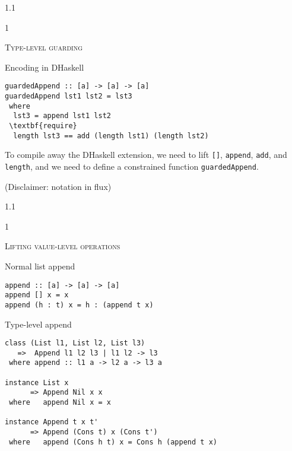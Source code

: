 \documentclass{slides}
\newcommand{\header}[1]{{\large\scshape \color{Red} #1} \medskip }
\newcommand{\blau}[1]{{\color{Blue} #1} \medskip }
\newenvironment{myslide}{\begin{slide}\color{Blue}\begin{boxedminipage}{1.1\hsize}\begin{boxedminipage}{1\hsize}\color{Black}
\vspace{-170\in}
}{%
\smallskip
\end{boxedminipage}
\end{boxedminipage}
\end{slide}}
\begin{document}



\begin{myslide}

\header{Type-level guarding}

\blau{Encoding in DHaskell}

\begin{Verbatim}[fontseries=normal,fontsize=\small,commandchars=\\\{\}]
guardedAppend :: [a] -> [a] -> [a]
guardedAppend lst1 lst2 = lst3
 where
  lst3 = append lst1 lst2
 \textbf{require}
  length lst3 == add (length lst1) (length lst2) 
\end{Verbatim}

\bigskip

{\small

To compile away the DHaskell extension, we need to lift \texttt{[]},
\texttt{append}, \texttt{add}, and \texttt{length}, and we need to
define a constrained function \texttt{guardedAppend}.

}

\medskip

(Disclaimer: notation in flux)

\end{myslide}






\begin{myslide}

\header{Lifting value-level operations}

\blau{Normal list append}

\begin{Verbatim}[fontseries=normal,fontsize=\tiny]
append :: [a] -> [a] -> [a]
append [] x = x
append (h : t) x = h : (append t x)
\end{Verbatim}

\blau{Type-level append}

\begin{Verbatim}[fontseries=normal,fontsize=\tiny]
class (List l1, List l2, List l3)
   =>  Append l1 l2 l3 | l1 l2 -> l3
 where append :: l1 a -> l2 a -> l3 a

instance List x
      => Append Nil x x
 where   append Nil x = x

instance Append t x t'
      => Append (Cons t) x (Cons t')
 where   append (Cons h t) x = Cons h (append t x)
\end{Verbatim}

\end{myslide}
\end{document}

